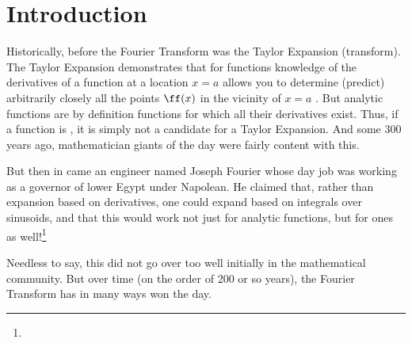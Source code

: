 \section{Introduction}
Historically, before the Fourier Transform was the Taylor Expansion (transform). 
The Taylor Expansion demonstrates that for  functions
knowledge of the derivatives of a function at a location $x=a$
allows you to determine (predict) arbitrarily closely all the points $\ff(x)$ in the vicinity of $x=a$ .
But analytic functions are by definition functions for which all their derivatives exist.
Thus, if a function is , it is simply not a candidate for a Taylor Expansion.
And some 300 years ago, mathematician giants of the day were fairly content with this.

But then in came an engineer named Joseph Fourier whose day job was working as a governor of lower Egypt under Napolean.
He claimed that, rather than expansion based on derivatives, one could expand based on integrals over sinusoids,
and that this would work not just for analytic functions, but for  ones as well!\footnote{}

\begin{minipage}{\tw-80mm}
Needless to say, this did not go over too well initially in the mathematical community. 
But over time (on the order of 200 or so years), the Fourier Transform has in many ways won the day.
\end{minipage}\hfill%

